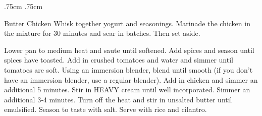 \documentclass[]{article}
\title{}
\author{}
\begin{document}
\RecipeWidths{\textwidth}{3cm}{0.5cm}{5cm} {.75cm} {.75cm}
\begin{recipe}{Butter Chicken}{}{}	
	Whisk together yogurt and seasonings. Marinade the chicken in the mixture for 30 minutes and sear in batches. Then set aside. 
	
	Lower pan to medium heat and saute until softened. 
	Add spices and season until spices have toasted.
	Add in crushed tomatoes and water and simmer until tomatoes are soft. Using an immersion blender, blend until smooth (if you don't have an immersion blender, use a regular blender). Add in chicken and simmer an additional 5 minutes.
	Stir in HEAVY cream until well incorporated. Simmer an additional 3-4 minutes.
	Turn off the heat and stir in unsalted butter until emulsified. Season to taste with salt. Serve with rice and cilantro.
\end{recipe}
\end{document}

